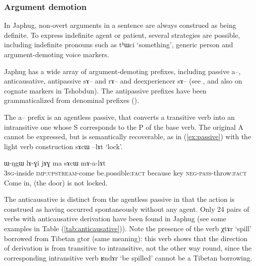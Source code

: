 \documentclass[oldfontcommands,oneside,a4paper,11pt]{article}
\newcommand{\ipa}[1]{{\phon#1}} %
\newcommand{\refb}[1]{(\ref{#1})}
\newcommand{\factual}[1]{\textsc{:fact}}
\begin{document}
\subsubsection{Argument demotion}
In Japhug, non-overt arguments in a sentence are always construed as being definite. To express indefinite agent or patient, several strategies are possible, including indefinite pronouns such as \ipa{tʰɯci} `something', generic person and argument-demoting voice markers.

Japhug has a wide array of argument-demoting prefixes, including passive \ipa{a--}, anticausative, antipassive \ipa{sɤ--} and \ipa{rɤ--} and deexperiencer \ipa{sɤ--} (see \citealt{jacques12demotion}, and also \citealt{jackson14morpho} on cognate markers in Tshobdun). The antipassive prefixes have been grammaticalized from denominal prefixes (\citealt{jacques14antipassive}).

The  \ipa{a--} prefix is an agentless passive, that converts a transitive verb into an intransitive one whose S corresponds to the P of the base verb. The original A cannot be expressed, but is semantically recoverable, as in \refb{ex:passive} with the light verb construction \ipa{sɤcɯ --lɤt} `lock'. 

\begin{exe}
\ex \label{ex:passive}
\gll 
\ipa{ɯ-ŋgɯ} 	\ipa{lɤ-ɣi} 	\ipa{jɤɣ} 	\ipa{ma} 	\ipa{sɤcɯ} 	\ipa{mɤ-a-lɤt} \\
\textsc{3sg}-inside \textsc{imp:upstream}-come  be.possible\factual{} because key \textsc{neg-pass}-throw\factual{} \\
\glt Come in, (the door) is not locked.
\end{exe}

The anticausative is distinct from the agentless passive in that the action is construed as having occurred spontaneously without any agent. Only 24 pairs of verbs with anticausative derivation have been found in Japhug (see some examples in Table \refb{tab:anticausative}). Note the presence of the verb \ipa{χtɤr} `spill' borrowed from Tibetan \ipa{gtor} (same meaning): this verb shows that the direction of derivation is from transitive to intransitive, not the other way round, since the corresponding intransitive verb \ipa{ʁndɤr} `be spilled' cannot be a Tibetan borrowing.
\end{document}
